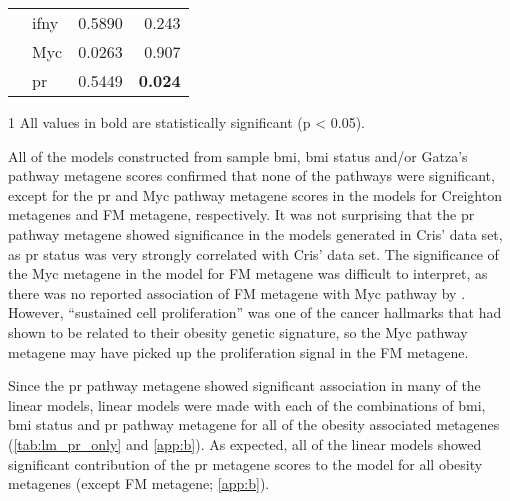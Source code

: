 \begin{table}[htpb]
\begin{threeparttable}
\begin{tabular}{llrr}
                                                                       & \gls{ifny} & 0.5890  & 0.243\\
                                                                       & Myc        & 0.0263  & 0.907\\
                                                                       & \gls{pr}   & 0.5449  & \textbf{0.024}\\
			\hline
			\hline
		\end{tabular}
		\begin{tablenotes}
			\begin{footnotesize}
				\item [1] All values in bold are statistically significant (p \textless{} 0.05).
			\end{footnotesize}
		\end{tablenotes}
	\end{threeparttable}
\end{table}

All of the models constructed from sample \gls{bmi}, \gls{bmi} status and/or Gatza's pathway metagene scores confirmed that none of the pathways were significant, except for the \gls{pr} and Myc pathway metagene scores in the models for Creighton metagenes and FM metagene, respectively.
It was not surprising that the \gls{pr} pathway metagene showed significance in the models generated in Cris' data set, as \gls{pr} status was very strongly correlated with Cris' data set.
The significance of the Myc metagene in the model for FM metagene was difficult to interpret, as there was no reported association of FM metagene with Myc pathway by \citet{Fuentes-Mattei2014}.
However, ``sustained cell proliferation'' was one of the cancer hallmarks that \citet{Fuentes-Mattei2014} had shown to be related to their obesity genetic signature, so the Myc pathway metagene may have picked up the proliferation signal in the FM metagene.

Since the \gls{pr} pathway metagene showed significant association in many of the linear models, linear models were made with each of the combinations of \gls{bmi}, \gls{bmi} status and \gls{pr} pathway metagene for all of the obesity associated metagenes (\cref{tab:lm_pr_only} and \cref{app:b}).
As expected, all of the linear models showed significant contribution of the \gls{pr} metagene scores to the model for all obesity metagenes (except FM metagene; \cref{app:b}).

